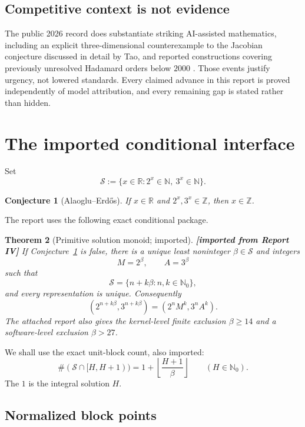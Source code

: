\documentclass[11pt,oneside]{article}
\newtheorem{theorem}{Theorem}[section]
\newtheorem{conjecture}[theorem]{Conjecture}
\theoremstyle{definition}
\theoremstyle{remark}
\newcommand{\N}{\mathbb N}
\newcommand{\Nzero}{\mathbb N_0}
\newcommand{\Z}{\mathbb Z}
\newcommand{\R}{\mathbb R}
\newcommand{\cS}{\mathcal S}
\newcommand{\statusimported}{\textcolor{conditionalblue}{\textbf{[imported from Report IV]}}}
\begin{document}
\subsection{Competitive context is not evidence}

The public 2026 record does substantiate striking AI-assisted mathematics, including an
explicit three-dimensional counterexample to the Jacobian conjecture discussed in detail by
Tao, and reported constructions covering previously unresolved Hadamard orders below $2000$
\cite{TaoJacobian2026,EpochHadamard2026}.  Those events justify urgency, not lowered standards.
Every claimed advance in this report is proved independently of model attribution, and every
remaining gap is stated rather than hidden.

\section{The imported conditional interface}
\label{sec:imported-interface}

Set
\[
 \cS:=\{x\in\R:2^x\in\N,\ 3^x\in\N\}.
\]

\begin{conjecture}[Alaoglu--Erd\H{o}s]
\label{conj:AE}
If $x\in\R$ and $2^x,3^x\in\Z$, then $x\in\Z$.
\end{conjecture}

The report uses the following exact conditional package.

\begin{theorem}[Primitive solution monoid; imported]
\label{thm:primitive-monoid}
\statusimported\quad
If Conjecture~\ref{conj:AE} is false, there is a unique least noninteger
$\beta\in\cS$ and integers
\[
 M=2^\beta,\qquad A=3^\beta
\]
such that
\[
 \cS=\{n+k\beta:n,k\in\Nzero\},
\]
and every representation is unique.  Consequently
\[
 (2^{n+k\beta},3^{n+k\beta})=(2^nM^k,3^nA^k).
\]
The attached report also gives the kernel-level finite exclusion $\beta\ge14$ and a
software-level exclusion $\beta>27$.
\end{theorem}

We shall use the exact unit-block count, also imported:
\begin{equation}
 \#(\cS\cap[H,H+1))=1+\left\lfloor\frac{H+1}{\beta}\right\rfloor
 \qquad(H\in\Nzero).
 \label{eq:exact-block-count}
\end{equation}
The $1$ is the integral solution $H$.

\subsection{Normalized block points}
\end{document}
